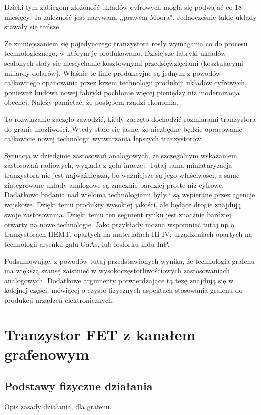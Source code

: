 Dzięki tym zabiegom złożoność układów cyfrowych mogła się podwajać co 18 miesięcy. Ta zależność jest nazywana ,,prawem
Moora". Jednocześnie takie układy stawały się tańsze.

Ze zmniejszaniem się pojedynczego tranzystora rosły wymagania co do procesu technologicznego, w którym je produkowano.
Dzisiejsze fabryki układów scalonych stały się niesłychanie kosztownymi przedsięwzięciami (kosztującymi miliardy dolarów).
Właśnie te linie produkcyjne są jednym z powodów całkowitego opanowania przez krzem technologii produkcji układów
 cyfrowych, ponieważ budowa nowej fabryki pochłonie więcej pieniędzy niż modernizacja obecnej. Należy pamiętać, że postępem
rządzi ekonomia.

To rozwiązanie zaczęło zawodzić, kiedy zaczęto dochodzić rozmiarami tranzystora do granic możliwości. Wtedy stało się jasne,
że niezbędne będzie opracowanie całkowicie nowej technologii wytwarzania lepszych tranzystorów.


Sytuacja w dziedzinie zastosowań analogowych, ze szczególnym wskazaniem zastosowań radiowych, wygląda z goła inaczej. 
Tutaj sama miniaturyzacja tranzystora nie jest najważniejsza, bo ważniejsze są jego właściwości, a same zintegrowane układy
analogowe są znacznie bardziej proste niż cyfrowe. Dodatkowo badania nad wieloma technologiami były i są wspierane przez
 agencje wojskowe. Dzięki temu produkty wysokiej jakości, ale będące drogie znajdują swoje zastosowania. Dzięki temu ten
 segment rynku jest znacznie bardziej otwarty na nowe technologie. Jako przykłady można wspomnieć tutaj np o tranzystorach
HEMT, opartych na materiałach III-IV; urządzeniach opartych na technologii arsenku galu GaAs, lub fosforku indu InP.

Podsumowując, z powodów tutaj przedstawionych wynika, że technologia grafenu ma większą szansę zaistnieć 
w wysokoczęstotliwościowych zastosowaniach analogowych. Dodatkowe argumenty potwierdzające tą tezę znajdują się 
w kolejnej części, mówiącej o czysto fizycznych aspektach stosowania grafenu do produkcji urządzeń elektronicznych.

	\section{Tranzystor FET z kanałem grafenowym}
		\subsection{Podstawy fizyczne działania}	
			Opis zasady działania, dla grafenu.
